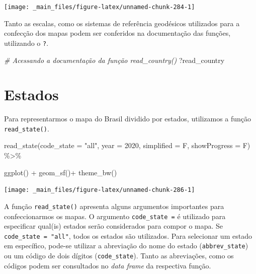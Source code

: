 \documentclass[
  brazilian,
]{book}
\newenvironment{Shaded}{\begin{snugshade}}{\end{snugshade}}
\newcommand{\AttributeTok}[1]{\textcolor[rgb]{0.77,0.63,0.00}{#1}}
\newcommand{\CommentTok}[1]{\textcolor[rgb]{0.56,0.35,0.01}{\textit{#1}}}
\newcommand{\DecValTok}[1]{\textcolor[rgb]{0.00,0.00,0.81}{#1}}
\newcommand{\FunctionTok}[1]{\textcolor[rgb]{0.00,0.00,0.00}{#1}}
\newcommand{\NormalTok}[1]{#1}
\newcommand{\SpecialCharTok}[1]{\textcolor[rgb]{0.00,0.00,0.00}{#1}}
\newcommand{\StringTok}[1]{\textcolor[rgb]{0.31,0.60,0.02}{#1}}
\begin{document}
\begin{center}\texttt{[image: \_main\_files/figure-latex/unnamed-chunk-284-1]} \end{center}

Tanto as escalas, como os sistemas de referência geodésicos utilizados para a confecção dos mapas podem ser conferidos na documentação das funções, utilizando o \texttt{?}.

\begin{Shaded}
\begin{Highlighting}[]
\CommentTok{\# Acessando a documentação da função \textasciigrave{}read\_country()\textasciigrave{} }
\NormalTok{?read\_country}
\end{Highlighting}
\end{Shaded}

\hypertarget{estados}{%
\section{Estados}\label{estados}}

Para representarmos o mapa do Brasil dividido por estados, utilizamos a função \texttt{read\_state()}.

\begin{Shaded}
\begin{Highlighting}[]
\FunctionTok{read\_state}\NormalTok{(}\AttributeTok{code\_state =} \StringTok{"all"}\NormalTok{,}
           \AttributeTok{year =} \DecValTok{2020}\NormalTok{,}
           \AttributeTok{simplified =}\NormalTok{ F,}
           \AttributeTok{showProgress =}\NormalTok{ F) }\SpecialCharTok{\%\textgreater{}\%} 
  
  \FunctionTok{ggplot}\NormalTok{() }\SpecialCharTok{+} 
  \FunctionTok{geom\_sf}\NormalTok{()}\SpecialCharTok{+}
  \FunctionTok{theme\_bw}\NormalTok{()}
\end{Highlighting}
\end{Shaded}

\begin{center}\texttt{[image: \_main\_files/figure-latex/unnamed-chunk-286-1]} \end{center}

A função \texttt{read\_state()} apresenta alguns argumentos importantes para confeccionarmos os mapas. O argumento \texttt{code\_state\ =} é utilizado para especificar qual(is) estados serão considerados para compor o mapa. Se \texttt{code\_state\ =\ "all"}, todos os estados são utilizados. Para selecionar um estado em específico, pode-se utilizar a abreviação do nome do estado (\texttt{abbrev\_state}) ou um código de dois dígitos (\texttt{code\_state}). Tanto as abreviações, como os códigos podem ser consultados no \emph{data frame} da respectiva função.
\end{document}
